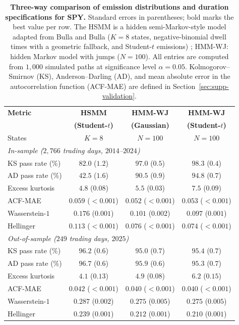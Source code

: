 \begin{table}[H]
\centering
\caption{\textbf{Three-way comparison of emission distributions and
    duration specifications for SPY.} Standard
    errors in parentheses; bold marks the best value per row. The HSMM
    is a hidden semi-Markov-style model adapted from Bulla and Bulla
    ($K = 8$ states, negative-binomial dwell times with a geometric
    fallback, and Student-$t$ emissions) \cite{bullaBulla2006}; HMM-WJ:
    hidden Markov model with jumps
    ($N = 100$). All entries are computed from $1{,}000$ simulated
    paths at significance level $\alpha = 0.05$. Kolmogorov--Smirnov
    (KS), Anderson--Darling (AD), and mean absolute error in the
    autocorrelation function (ACF-MAE) are defined in
    Section~\ref{sec:supp-validation}.}
\label{tab:emission_hsmm}
\small
\begin{tabular}{@{}lccc@{}}
\toprule
\textbf{Metric} & \textbf{HSMM} & \textbf{HMM-WJ} & \textbf{HMM-WJ} \\
                & \textbf{(Student-$t$)} & \textbf{(Gaussian)} & \textbf{(Student-$t$)} \\ \midrule
States              & $K = 8$ & $N = 100$ & $N = 100$ \\[4pt]
\multicolumn{4}{l}{\textit{In-sample ($2{,}766$ trading days, $2014$--$2024$)}} \\[2pt]
KS pass rate (\%)   &  $82.0$ ($1.2$)         &  $97.0$ ($0.5$)         & $\mathbf{98.3}$ ($0.4$) \\
AD pass rate (\%)   &  $42.5$ ($1.6$)         &  $90.5$ ($0.9$)         & $\mathbf{94.8}$ ($0.7$) \\
Excess kurtosis     &   $4.8$ ($0.08$)        &   $5.5$ ($0.03$)        & $\mathbf{7.5}$ ($0.09$) \\
ACF-MAE             & $0.059$ ($<\!0.001$)    & $\mathbf{0.052}$ ($<\!0.001$) & $0.053$ ($<\!0.001$) \\
Wasserstein-$1$     & $0.176$ ($0.001$)       & $0.101$ ($0.002$)       & $\mathbf{0.097}$ ($0.001$) \\
Hellinger           & $0.113$ ($<\!0.001$)    & $0.076$ ($<\!0.001$)   & $\mathbf{0.074}$ ($<\!0.001$) \\[4pt]
\multicolumn{4}{l}{\textit{Out-of-sample ($249$ trading days, $2025$)}} \\[2pt]
KS pass rate (\%)   & $\mathbf{96.2}$ ($0.6$) &  $95.0$ ($0.7$)         &  $95.4$ ($0.7$) \\
AD pass rate (\%)   & $\mathbf{96.7}$ ($0.6$) &  $95.9$ ($0.6$)         &  $95.3$ ($0.7$) \\
Excess kurtosis     &   $4.1$ ($0.13$)        &   $4.9$ ($0.08$)        & $\mathbf{6.2}$ ($0.15$) \\
ACF-MAE             & $0.042$ ($<\!0.001$)    & $\mathbf{0.040}$ ($<\!0.001$) & $\mathbf{0.040}$ ($<\!0.001$) \\
Wasserstein-$1$     & $0.287$ ($0.002$)       & $\mathbf{0.275}$ ($0.005$) & $\mathbf{0.275}$ ($0.005$) \\
Hellinger           & $0.239$ ($0.001$)       & $0.212$ ($0.001$)       & $\mathbf{0.210}$ ($0.001$) \\
\bottomrule
\end{tabular}
\end{table}

